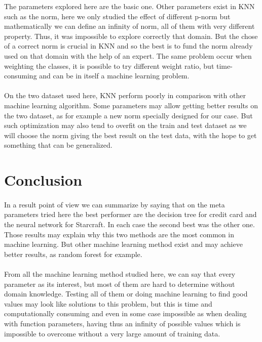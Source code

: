 \documentclass[twocolumn,a4paper,10pt]{article}
\begin{document}
The parameters explored here are the basic one. Other parameters exist
in KNN such as the norm, here we only studied the effect of different
p-norm but mathematically we can define an infinity of norm, all of
them with very different property. Thus, it was impossible to explore
correctly that domain. But the chose of a correct norm is crucial
in KNN and so the best is to fund the norm already used on that domain
with the help of an expert. The same problem occur when weighting
the classes, it is possible to try different weight ratio, but time-consuming
and can be in itself a machine learning problem.

\paragraph{}

On the two dataset used here, KNN perform poorly in comparison with
other machine learning algorithm. Some parameters may allow getting
better results on the two dataset, as for example a new norm specially
designed for our case. But such optimization may also tend to overfit
on the train and test dataset as we will choose the norm giving the
best result on the test data, with the hope to get something that
can be generalized.

\section{Conclusion}

\paragraph{}

In a result point of view we can summarize by saying that on the meta
parameters tried here the best performer are the decision tree for
credit card and the neural network for Starcraft. In each case the
second best was the other one. Those results may explain why this
two methods are the most common in machine learning. But other machine
learning method exist and may achieve better results, as random forest
for example.

\paragraph{}

From all the machine learning method studied here, we can say that
every parameter as its interest, but most of them are hard to determine
without domain knowledge. Testing all of them or doing machine learning
to find good values may look like solutions to this problem, but this
is time and computationally consuming and even in some case impossible
as when dealing with function parameters, having thus an infinity
of possible values which is impossible to overcome without a very
large amount of training data.
\end{document}
